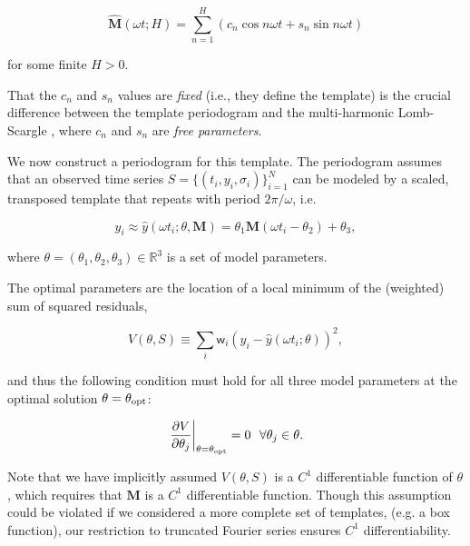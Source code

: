 \documentclass[apj]{emulateapj}
\newcommand{\wgt}{\mathsf{w}}  %
\begin{document}
\begin{equation}\label{eq:templateFourier}
    \hat{\mathbf{M}}(\omega t;H) = \sum_{n=1}^H\left(c_n\cos{n\omega t} + s_n\sin{n\omega t}\right)
\end{equation}

\noindent for some finite $H > 0$.

That the $c_n$ and $s_n$ values are \emph{fixed} (i.e., they define
the template) is the crucial difference between the template periodogram and
the multi-harmonic Lomb-Scargle \citep{Palmer_2009,Bretthorst+Chi-Cheng_1988}, where $c_n$ and $s_n$
are \emph{free parameters}.

We now construct a periodogram for this template. The periodogram assumes
that an observed time series $S = \{(t_i, y_i, \sigma_i)\}_{i=1}^N$ can be modeled
by a scaled, transposed template that repeats with period $2\pi / \omega$, i.e.

\begin{equation}\label{eq:templateModel}
y_i \approx \hat{y}(\omega t_i;\theta, \mathbf{M}) = \theta_1\mathbf{M}(\omega t_i - \theta_2) + \theta_3,
\end{equation}

\noindent where $\theta = (\theta_1, \theta_2, \theta_3)\in \mathbb{R}^3$ is a set of model parameters.

The optimal parameters are the location of a local minimum of the (weighted) sum of
squared residuals,

\begin{equation}\label{eq:Vdef}
    V(\theta, S) \equiv \sum_i \wgt_i (y_i - \hat{y}(\omega t_i;\theta) )^2,
\end{equation}

\noindent and thus the following condition must hold for all three model parameters at
the optimal solution $\theta=\theta_{\rm opt}$:

\begin{equation}\label{eq:chi2conds}
    \left.\frac{\partial V}{\partial\theta_j}\right|_{\theta=\theta_{\rm opt}} = 0~~\forall\theta_j\in\theta.
\end{equation}

Note that we have implicitly assumed $V(\theta,S)$ is a $C^1$ differentiable
function of $\theta$, which requires that $\mathbf{M}$ is a
$C^1$ differentiable function. Though this assumption could be violated if we
considered a more complete set of templates, (e.g. a box function), our restriction
to truncated Fourier series ensures $C^1$ differentiability.
\end{document}
